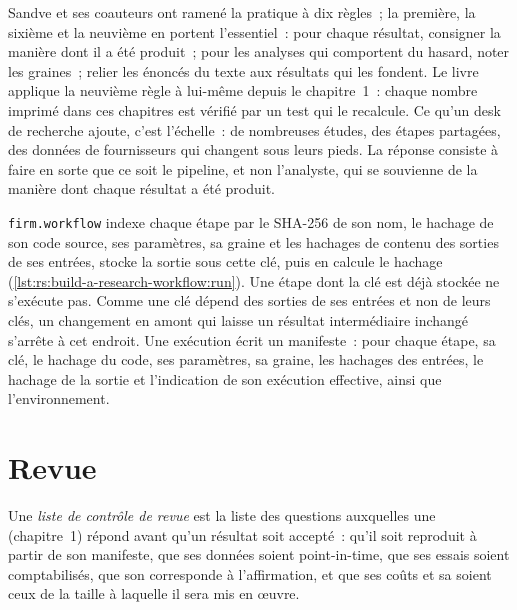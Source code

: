 Sandve et ses coauteurs ont ramené la pratique à dix règles~; la première, la sixième et la neuvième en portent l'essentiel~: pour chaque résultat, consigner la manière dont il a été produit~; pour
les analyses qui comportent du hasard, noter les graines~; relier les énoncés du texte aux résultats qui les fondent. Le livre applique la neuvième règle à lui-même depuis
le chapitre~1~: chaque nombre imprimé dans ces chapitres est vérifié par un test qui le recalcule. Ce qu'un desk de recherche ajoute, c'est l'échelle~: de nombreuses études, des étapes partagées,
des données de fournisseurs qui changent sous leurs pieds. La réponse consiste à faire en sorte que ce soit le pipeline, et non l'analyste, qui se souvienne de la manière dont chaque résultat a été produit.

\texttt{firm.workflow} indexe chaque étape par le SHA-256 de son nom, le hachage de son code source, ses paramètres, sa graine et les hachages de contenu des
sorties de ses entrées, stocke la sortie sous cette clé, puis en calcule le hachage (\cref{lst:rs:build-a-research-workflow:run}). Une étape dont la clé est déjà stockée
ne s'exécute pas. Comme une clé dépend des sorties de ses entrées et non de leurs clés, un changement en amont qui laisse un résultat intermédiaire inchangé s'arrête à cet endroit. Une exécution
écrit un manifeste~: pour chaque étape, sa clé, le hachage du code, ses paramètres, sa graine, les hachages des entrées, le hachage de la sortie et l'indication de son exécution effective, ainsi que l'environnement.

\section{Revue}

\begin{definition}\label{def:rs:build-a-research-workflow:review}
Une \emph{liste de contrôle de revue} est la liste des questions auxquelles une  (chapitre~1) répond avant qu'un résultat soit accepté~: qu'il soit reproduit à partir de son manifeste,
que ses données soient point-in-time, que ses essais soient comptabilisés, que son  corresponde à l'affirmation, et que ses coûts et
sa  soient ceux de la taille à laquelle il sera mis en œuvre.
\end{definition}

